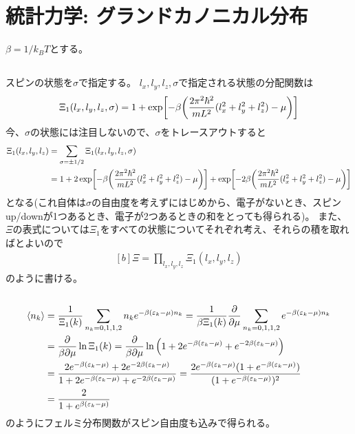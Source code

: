 \documentclass[../ap_2011.tex]{subfiles}
\begin{document}
\chapter{統計力学: グランドカノニカル分布}
\(\beta=1/k_BT\)とする。
\section{}
スピンの状態を\(\sigma\)で指定する。
\(l_x,l_y,l_z,\sigma\)で指定される状態の分配関数は
\begin{equation}\begin{aligned}[b]
    \Xi_1(l_x,l_y,l_z,\sigma) = 1+\exp[-\beta\qty(\frac{2\pi^2\hbar^2}{mL^2}(l_x^2+l_y^2+l_z^2)-\mu)]
\end{aligned}\end{equation}
今、\(\sigma\)の状態には注目しないので、\(\sigma\)をトレースアウトすると
\begin{equation}\begin{aligned}[b]
    \Xi_1(l_x,l_y,l_z)&=\sum_{\sigma=\pm1/2}\Xi_1(l_x,l_y,l_z,\sigma)\\
    &=1+2\exp[-\beta\qty(\frac{2\pi^2\hbar^2}{mL^2}(l_x^2+l_y^2+l_z^2)-\mu)]+\exp[-2\beta\qty(\frac{2\pi^2\hbar^2}{mL^2}(l_x^2+l_y^2+l_z^2)-\mu)]
\end{aligned}\end{equation}
となる(これ自体は\(\sigma\)の自由度を考えずにはじめから、電子がないとき、スピンup/downが1つあるとき、電子が2つあるときの和をとっても得られる)。
また、\(\Xi\)の表式については\(\Xi_1\)をすべての状態についてそれぞれ考え、それらの積を取ればとよいので
\begin{equation}\begin{aligned}[b]
    \Xi = \prod_{l_x,l_y,l_z}\Xi_1(l_x,l_y,l_z)
\end{aligned}\end{equation}
のように書ける。

\section{}
\begin{equation}\begin{aligned}[b]
    \ev{n_k}&=\frac{1}{\Xi_1(k)}\sum_{n_k=0,1,1,2}n_ke^{-\beta(\varepsilon_k-\mu)n_k}
    =\frac{1}{\beta\Xi_1(k)}\pdv{\mu}\sum_{n_k=0,1,1,2}e^{-\beta(\varepsilon_k-\mu)n_k}\\
    &=\frac{\partial}{\beta\partial\mu}\ln\Xi_1(k)
    =\frac{\partial}{\beta\partial\mu}\ln\qty(1+2e^{-\beta(\varepsilon_k-\mu)}+e^{-2\beta(\varepsilon_k-\mu)})\\
    &=\frac{2e^{-\beta(\varepsilon_k-\mu)}+2e^{-2\beta(\varepsilon_k-\mu)}}{1+2e^{-\beta(\varepsilon_k-\mu)}+e^{-2\beta(\varepsilon_k-\mu)}}
    =\frac{2e^{-\beta(\varepsilon_k-\mu)}(1+e^{-\beta(\varepsilon_k-\mu)})}{(1+e^{-\beta(\varepsilon_k-\mu)})^2}\\
    &=\frac{2}{1+e^{\beta(\varepsilon_k-\mu)}}
\end{aligned}\end{equation}
のようにフェルミ分布関数がスピン自由度も込みで得られる。
\end{document}
